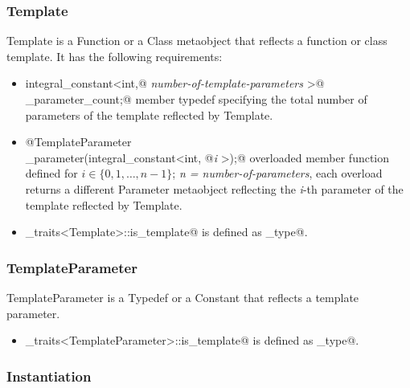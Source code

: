\subsubsection{Template}

{\metaobject Template} is a {\metaobject Function} or a {\metaobject Class} metaobject
that reflects a function or class template. It has the following requirements:

\begin{itemize}

	\item{\verb@typedef integral_constant<int,@ {\em number-of-template-parameters}
	\verb@>@\\\verb@template_parameter_count;@} member typedef specifying the total number
	of parameters of the template reflected by {\metaobject Template}.

	\item{\verb@static @{\metaobject TemplateParameter}\\\verb@template_parameter(integral_constant<int, @{\em i}
	\verb@>);@} overloaded member function defined
	for $i \in \{0, 1, \dots, n-1\}$; {\em n = number-of-parameters},
	each overload returns a different {\metaobject Parameter} metaobject reflecting the {\em i}-th parameter
	of the template reflected by {\metaobject Template}.


	\item \verb@metaobject_traits<Template>::is_template@ is defined as \verb@true_type@.
\end{itemize}

\subsubsection{TemplateParameter}

{\metaobject TemplateParameter} is a {\metaobject Typedef} or a {\metaobject Constant} that
reflects a template parameter. 

\begin{itemize}
	\item \verb@metaobject_traits<TemplateParameter>::is_template@ is defined as \verb@true_type@.
\end{itemize}

\subsubsection{Instantiation}

